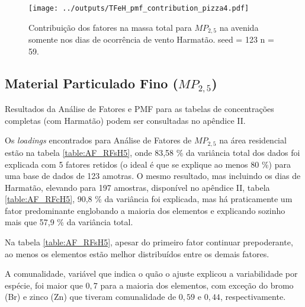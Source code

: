 \begin{landscape}
  \begin{figure}
    \centering
    \begin{minipage}[b]{0.45\linewidth}
      \texttt{[image: ../outputs/TFeH\_pmf\_contribution\_pizza4.pdf]}
      \caption{Contribuição dos fatores na massa total para $MP_{2,5}$ na avenida
               somente nos dias de ocorrência de vento Harmatão. seed = 123 n = 59.
               \label{fig:TFeH_contribution4}}
    \end{minipage}%
    \hspace{0.5cm}
    \begin{minipage}[b]{0.45\linewidth}
      
    \end{minipage}
  \end{figure}
\end{landscape}

\subsection{Material Particulado Fino ($MP_{2,5}$)}

Resultados da Análise de Fatores e PMF para as tabelas de concentrações 
completas (com Harmatão) podem ser consultadas no apêndice II.

Os \textit{loadings} encontrados para Análise de Fatores de $MP_{2,5}$
na área residencial estão na tabela \ref{table:AF_RFsH5}, onde 83,58 \% 
da variância total dos dados foi explicada com 5 fatores retidos 
(o ideal é que se explique ao menos 80 \%) para uma base de dados de 123 amotras. 
O mesmo resultado, mas incluindo os dias de Harmatão, elevando para 197 amostras, 
disponível no apêndice II, tabela \ref{table:AF_RFcH5}, 90,8 \% da variância
foi explicada, mas há praticamente um fator predominante 
englobando a maioria dos elementos e explicando sozinho mais que 57,9 \% da 
variância total.

Na tabela \ref{table:AF_RFsH5}, apesar do primeiro fator continuar prepoderante,
ao menos os elementos estão melhor distribuídos entre os demais fatores.  

A comunalidade, variável que indica o quão o ajuste explicou a variabilidade por 
espécie, foi maior que $0,7$ para a maioria dos elementos,
com exceção do bromo (Br) e zinco (Zn) que tiveram comunalidade de $0,59$ e 
$0,44$, respectivamente.

